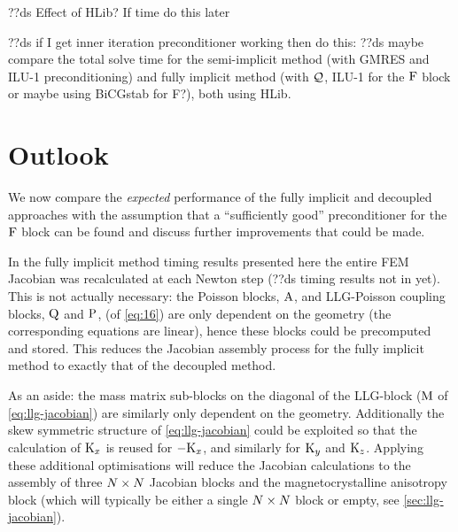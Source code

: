??ds Effect of HLib? If time do this later


??ds if I get inner iteration preconditioner working then do this:
??ds maybe compare the total solve time for the semi-implicit method (with GMRES and ILU-1 preconditioning) and fully implicit method (with $\mathcal{Q}$, ILU-1 for the $\mathrm{F}$ block or maybe using BiCGstab for F?), both using HLib.



\section{Outlook}
\label{sec:furth-optim-opport}

We now compare the \emph{expected} performance of the fully implicit and decoupled approaches with the assumption that a ``sufficiently good'' preconditioner for the $\mathrm{F}$ block can be found and discuss further improvements that could be made.

In the fully implicit method timing results presented here the entire FEM Jacobian was recalculated at each Newton step (??ds timing results not in yet).
This is not actually necessary: the Poisson blocks, $\mathrm{A}$, and LLG-Poisson coupling blocks, $\mathrm{Q}$ and $\mathrm{P}$, (of \cref{eq:16}) are only dependent on the geometry (\ie the corresponding equations are linear), hence these blocks could be precomputed and stored.
This reduces the Jacobian assembly process for the fully implicit method to exactly that of the decoupled method.

As an aside: the mass matrix sub-blocks on the diagonal of the LLG-block ($\mathrm{M}$ of \cref{eq:llg-jacobian}) are similarly only dependent on the geometry.
Additionally the skew symmetric structure of \cref{eq:llg-jacobian} could be exploited so that the calculation of $\mathrm{K}_x$ is reused for $-\mathrm{K}_x$, and similarly for $\mathrm{K}_y$ and $\mathrm{K}_z$.
Applying these additional optimisations will reduce the Jacobian calculations to the assembly of three $N \times N$ Jacobian blocks and the magnetocrystalline anisotropy block (which will typically be either a single $N \times N$ block or empty, see \cref{sec:llg-jacobian}).



